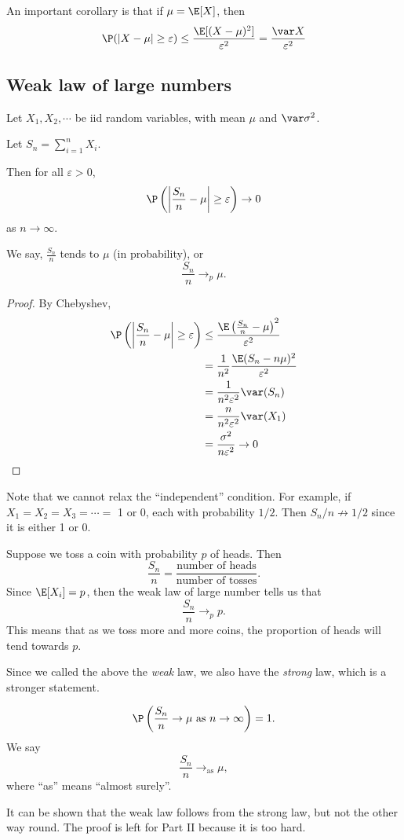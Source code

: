 \documentclass[a4paper]{article}
\begin{document}
An important corollary is that if $\mu = \E[X]$, then
\[
  \P(|X - \mu| \geq \varepsilon) \leq \frac{\E[(X - \mu)^2]}{\varepsilon^2} = \frac{\var X}{\varepsilon^2}
\]

\subsection{Weak law of large numbers}
\begin{thm}
  Let $X_1, X_2, \cdots$ be iid random variables, with mean $\mu$ and $\var \sigma^2$.

  Let $S_n = \sum_{i = 1}^n X_i$.

  Then for all $\varepsilon > 0$,
  \[
    \P\left(\left|\frac{S_n}{n} - \mu\right| \geq \varepsilon\right) \to 0
  \]
  as $n\to \infty$.

  We say, $\frac{S_n}{n}$ tends to $\mu$ (in probability), or
  \[
    \frac{S_n}{n}\to_p \mu.
  \]
\end{thm}

\begin{proof}
  By Chebyshev,
  \begin{align*}
    \P\left(\left|\frac{S_n}{n} - \mu\right| \geq \varepsilon\right)&\leq \frac{\E\left(\frac{S_n}{n} - \mu\right)^2}{\varepsilon^2}\\
    &= \frac{1}{n^2}\frac{\E(S_n -n\mu)^2}{\varepsilon^2}\\
    &= \frac{1}{n^2\varepsilon^2}\var (S_n)\\
    &= \frac{n}{n^2\varepsilon^2}\var (X_1)\\
    &= \frac{\sigma^2}{n\varepsilon^2} \to 0\qedhere
  \end{align*}
\end{proof}

Note that we cannot relax the ``independent'' condition. For example, if $X_1 = X_2 = X_3 = \cdots = $ 1 or 0, each with probability $1/2$. Then $S_n/n \not\to 1/2$ since it is either 1 or 0.

\begin{eg}
  Suppose we toss a coin with probability $p$ of heads. Then
  \[
    \frac{S_n}{n} = \frac{\text{number of heads}}{\text{number of tosses}}.
  \]
  Since $\E[X_i] = p$, then the weak law of large number tells us that
  \[
    \frac{S_n}{n} \to_p p.
  \]
  This means that as we toss more and more coins, the proportion of heads will tend towards $p$.
\end{eg}

Since we called the above the \emph{weak} law, we also have the \emph{strong} law, which is a stronger statement.
\begin{thm}
  \[
    \P\left(\frac{S_n}{n}\to \mu\text{ as }n\to \infty\right) = 1.
  \]
  We say
  \[
    \frac{S_n}{n}\to_{\mathrm{as}} \mu,
  \]
  where ``as'' means ``almost surely''.
\end{thm}
It can be shown that the weak law follows from the strong law, but not the other way round. The proof is left for Part II because it is too hard.
\end{document}
